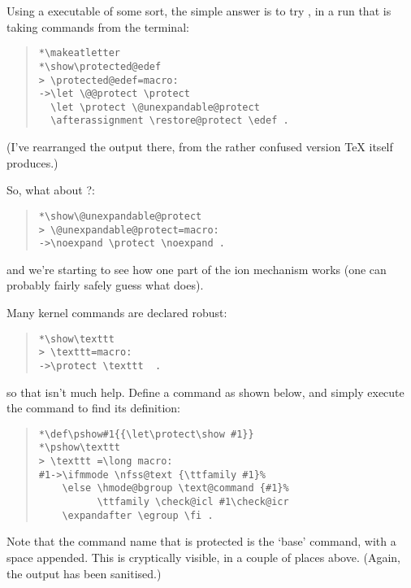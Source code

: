 Using a \tex{} executable of some sort, the simple answer is to try
, in a run that is taking commands from the terminal:
\begin{quote}
\begin{verbatim}
*\makeatletter
*\show\protected@edef
> \protected@edef=macro:
->\let \@@protect \protect
  \let \protect \@unexpandable@protect
  \afterassignment \restore@protect \edef .
\end{verbatim}
\end{quote}
(I've rearranged the output there, from the rather confused version
\TeX{} itself produces.)

So, what about ?:
\begin{quote}
\begin{verbatim}
*\show\@unexpandable@protect
> \@unexpandable@protect=macro:
->\noexpand \protect \noexpand .
\end{verbatim}
\end{quote}
and we're starting to see how one part of the ion
mechanism works (one can probably fairly safely guess what
 does).

Many kernel commands are declared robust:
\begin{quote}
\begin{verbatim}
*\show\texttt
> \texttt=macro:
->\protect \texttt  .
\end{verbatim}
\end{quote}
so that  isn't much help.  Define a command  as
shown below, and simply execute the command to find its definition:
\begin{quote}
\begin{verbatim}
*\def\pshow#1{{\let\protect\show #1}}
*\pshow\texttt
> \texttt =\long macro:
#1->\ifmmode \nfss@text {\ttfamily #1}%
    \else \hmode@bgroup \text@command {#1}%
          \ttfamily \check@icl #1\check@icr
    \expandafter \egroup \fi .
\end{verbatim}
\end{quote}
Note that the command name that is protected is the `base' command,
with a space appended.  This is cryptically visible, in a couple of
places above.  (Again, the output has been sanitised.)

